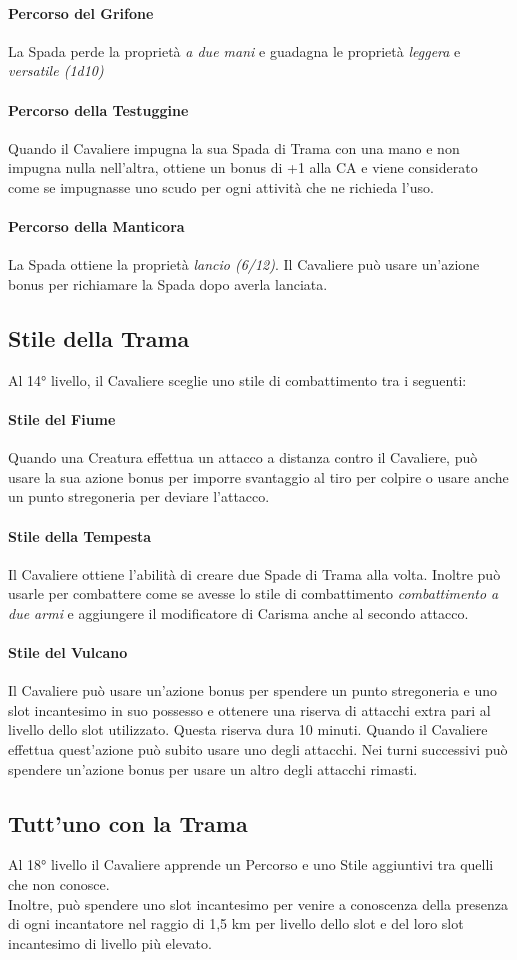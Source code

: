 \paragraph{Percorso del Grifone} La Spada perde la proprietà \textit{a due mani} e guadagna le proprietà \textit{leggera} e \textit{versatile (1d10)}
\paragraph{Percorso della Testuggine} Quando il Cavaliere impugna la sua Spada di Trama con una mano e non impugna nulla nell'altra, ottiene un bonus di +1 alla CA e viene considerato come se impugnasse uno scudo per ogni attività che ne richieda l'uso.
\paragraph{Percorso della Manticora} La Spada ottiene la proprietà \textit{lancio (6/12)}. Il Cavaliere può usare un'azione bonus per richiamare la Spada dopo averla lanciata.

\subsection{Stile della Trama}
Al 14° livello, il Cavaliere sceglie uno stile di combattimento tra i seguenti:
\paragraph{Stile del Fiume} Quando una Creatura effettua un attacco a distanza contro il Cavaliere, può usare la sua azione bonus per imporre svantaggio al tiro per colpire o usare anche un punto stregoneria per deviare l'attacco.
\paragraph{Stile della Tempesta} Il Cavaliere ottiene l'abilità di creare due Spade di Trama alla volta. Inoltre può usarle per combattere come se avesse lo stile di combattimento \textit{combattimento a due armi} e aggiungere il modificatore di Carisma anche al secondo attacco.
\paragraph{Stile del Vulcano} Il Cavaliere può usare un'azione bonus per spendere un punto stregoneria e uno slot incantesimo in suo possesso e ottenere una riserva di attacchi extra pari al livello dello slot utilizzato. Questa riserva dura 10 minuti. Quando il Cavaliere effettua quest'azione può subito usare uno degli attacchi. Nei turni successivi può spendere un'azione bonus per usare un altro degli attacchi rimasti.

\subsection{Tutt'uno con la Trama}
Al 18° livello il Cavaliere apprende un Percorso e uno Stile aggiuntivi tra quelli che non conosce.
\\ Inoltre, può spendere uno slot incantesimo per venire a conoscenza della presenza di ogni incantatore nel raggio di 1,5 km per livello dello slot e del loro slot incantesimo di livello più elevato.